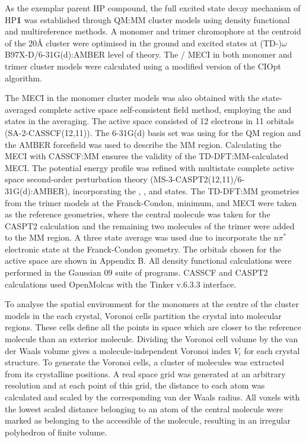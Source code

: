 As the exemplar parent \ac{HP} compound, the full excited state decay mechanism of \ac{HP}\textbf{1} was established through QM:MM cluster models using density functional and multireference methods. A monomer and trimer chromophore at the centroid of the 20{\AA} cluster were optimised in the ground and excited states at (TD-)$\omega$B97X-D/6-31G(d):AMBER level of theory. The \sone/\szero{} MECI in both monomer and trimer cluster models were calculated using a modified version of the CIOpt algorithm.\cite{Levine2008} 

The MECI in the monomer cluster models was also obtained with the state-averaged complete active space self-consistent field method, employing the \szero{} and \sone{} states in the averaging. The active space consisted of 12 electrons in 11 orbitals (SA-2-CASSCF(12,11)). The 6-31G(d) basis set was using for the QM region and the AMBER forcefield was used to describe the MM region. Calculating the MECI with CASSCF:MM ensures the validity of the TD-DFT:MM-calculated MECI. The potential energy profile was refined with multistate complete active space second-order perturbation theory (MS-3-CASPT2(12,11)/6-31G(d):AMBER), incorporating the \szero{}, \sone{}, and \stwo{} states. The TD-DFT:MM geometries from the trimer models at the Franck-Condon, \sone{} minimum, and MECI were taken as the reference geometries, where the central molecule was taken for the CASPT2 calculation and the remaining two molecules of the trimer were added to the MM region.  A three state average was used due to incorporate the n$\pi^{\ast}$ \stwo{} electronic state at the Franck-Condon geometry. The orbitals chosen for the active space are shown in Appendix B. All density functional calculations were performed in the Gaussian 09 suite of programs.\cite{g09} CASSCF and CASPT2 calculations used OpenMolcas with the Tinker v.6.3.3 interface.\cite{Aquilante2016}

To analyse the spatial environment for the monomers at the centre of the cluster models in the each crystal, Voronoi cells partition the crystal into molecular regions. These cells define all the points in space which are closer to the reference molecule than an exterior molecule. Dividing the Voronoi cell volume by the van der Waals volume gives a molecule-independent Voronoi index $V_{i}$ for each crystal structure. To generate the Voronoi cells, a cluster of molecules was extracted from its crystalline positions. A real space grid was generated at an arbitrary resolution and at each point of this grid, the distance to each atom was calculated and scaled by the corresponding van der Waals radius. All voxels with the lowest scaled distance belonging to an atom of the central molecule were marked as belonging to the accessible of the molecule, resulting in an irregular polyhedron of finite volume. 

